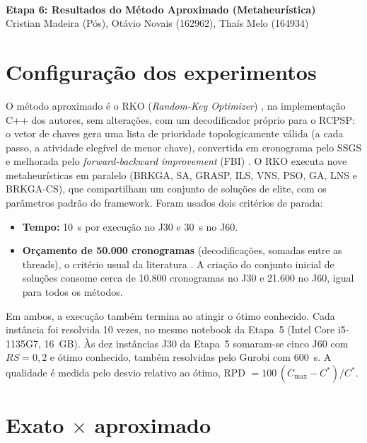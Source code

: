 \documentclass[11pt,a4paper]{article}
\newcommand{\cmax}{C_{\max}}
\begin{document}
\\[6pt]
{\bfseries Etapa 6: Resultados do Método Aproximado (Metaheurística)}\\
Cristian Madeira (Pós), Otávio Novais (162962), Thaís Melo (164934)

\section*{Configuração dos experimentos}

O método aproximado é o RKO (\emph{Random-Key Optimizer}) \cite{rko}, na implementação C++ dos
autores, sem alterações, com um decodificador próprio para o RCPSP: o vetor de chaves gera uma
lista de prioridade topologicamente válida (a cada passo, a atividade elegível de menor chave),
convertida em cronograma pelo SSGS e melhorada pelo \emph{forward-backward improvement} (FBI)
\cite{valls}. O RKO executa nove metaheurísticas em paralelo (BRKGA, SA, GRASP, ILS, VNS, PSO, GA,
LNS e BRKGA-CS), que compartilham um conjunto de soluções de elite, com os parâmetros padrão do
framework. Foram usados dois critérios de parada:

\begin{itemize}
  \item \textbf{Tempo:} 10~s por execução no J30 e 30~s no J60.
  \item \textbf{Orçamento de 50.000 cronogramas} (decodificações, somadas entre as threads), o
        critério usual da literatura \cite{kolisch}. A criação do conjunto inicial de soluções
        consome cerca de 10.800 cronogramas no J30 e 21.600 no J60, igual para todos os métodos.
\end{itemize}

Em ambos, a execução também termina ao atingir o ótimo conhecido. Cada instância foi resolvida
10 vezes, no mesmo notebook da Etapa~5 (Intel Core i5-1135G7, 16~GB). Às dez instâncias J30 da
Etapa~5 somaram-se cinco J60 com $RS = 0{,}2$ e ótimo conhecido, também resolvidas pelo Gurobi
com 600~s. A qualidade é medida pelo desvio relativo ao ótimo, RPD $= 100\,(\cmax - C^*)/C^*$.

\section*{Exato $\times$ aproximado}
\end{document}
